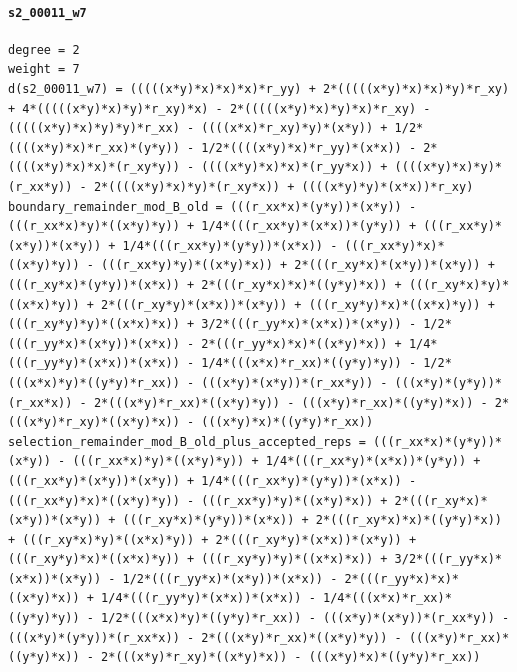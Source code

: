 \documentclass[11pt]{article}
\begin{document}
\paragraph{\texttt{s2\_00011\_w7}}
\begin{verbatim}
degree = 2
weight = 7
d(s2_00011_w7) = (((((x*y)*x)*x)*x)*r_yy) + 2*(((((x*y)*x)*x)*y)*r_xy) + 4*(((((x*y)*x)*y)*r_xy)*x) - 2*(((((x*y)*x)*y)*x)*r_xy) - (((((x*y)*x)*y)*y)*r_xx) - ((((x*x)*r_xy)*y)*(x*y)) + 1/2*((((x*y)*x)*r_xx)*(y*y)) - 1/2*((((x*y)*x)*r_yy)*(x*x)) - 2*((((x*y)*x)*x)*(r_xy*y)) - ((((x*y)*x)*x)*(r_yy*x)) + ((((x*y)*x)*y)*(r_xx*y)) - 2*((((x*y)*x)*y)*(r_xy*x)) + ((((x*y)*y)*(x*x))*r_xy)
boundary_remainder_mod_B_old = (((r_xx*x)*(y*y))*(x*y)) - (((r_xx*x)*y)*((x*y)*y)) + 1/4*(((r_xx*y)*(x*x))*(y*y)) + (((r_xx*y)*(x*y))*(x*y)) + 1/4*(((r_xx*y)*(y*y))*(x*x)) - (((r_xx*y)*x)*((x*y)*y)) - (((r_xx*y)*y)*((x*y)*x)) + 2*(((r_xy*x)*(x*y))*(x*y)) + (((r_xy*x)*(y*y))*(x*x)) + 2*(((r_xy*x)*x)*((y*y)*x)) + (((r_xy*x)*y)*((x*x)*y)) + 2*(((r_xy*y)*(x*x))*(x*y)) + (((r_xy*y)*x)*((x*x)*y)) + (((r_xy*y)*y)*((x*x)*x)) + 3/2*(((r_yy*x)*(x*x))*(x*y)) - 1/2*(((r_yy*x)*(x*y))*(x*x)) - 2*(((r_yy*x)*x)*((x*y)*x)) + 1/4*(((r_yy*y)*(x*x))*(x*x)) - 1/4*(((x*x)*r_xx)*((y*y)*y)) - 1/2*(((x*x)*y)*((y*y)*r_xx)) - (((x*y)*(x*y))*(r_xx*y)) - (((x*y)*(y*y))*(r_xx*x)) - 2*(((x*y)*r_xx)*((x*y)*y)) - (((x*y)*r_xx)*((y*y)*x)) - 2*(((x*y)*r_xy)*((x*y)*x)) - (((x*y)*x)*((y*y)*r_xx))
selection_remainder_mod_B_old_plus_accepted_reps = (((r_xx*x)*(y*y))*(x*y)) - (((r_xx*x)*y)*((x*y)*y)) + 1/4*(((r_xx*y)*(x*x))*(y*y)) + (((r_xx*y)*(x*y))*(x*y)) + 1/4*(((r_xx*y)*(y*y))*(x*x)) - (((r_xx*y)*x)*((x*y)*y)) - (((r_xx*y)*y)*((x*y)*x)) + 2*(((r_xy*x)*(x*y))*(x*y)) + (((r_xy*x)*(y*y))*(x*x)) + 2*(((r_xy*x)*x)*((y*y)*x)) + (((r_xy*x)*y)*((x*x)*y)) + 2*(((r_xy*y)*(x*x))*(x*y)) + (((r_xy*y)*x)*((x*x)*y)) + (((r_xy*y)*y)*((x*x)*x)) + 3/2*(((r_yy*x)*(x*x))*(x*y)) - 1/2*(((r_yy*x)*(x*y))*(x*x)) - 2*(((r_yy*x)*x)*((x*y)*x)) + 1/4*(((r_yy*y)*(x*x))*(x*x)) - 1/4*(((x*x)*r_xx)*((y*y)*y)) - 1/2*(((x*x)*y)*((y*y)*r_xx)) - (((x*y)*(x*y))*(r_xx*y)) - (((x*y)*(y*y))*(r_xx*x)) - 2*(((x*y)*r_xx)*((x*y)*y)) - (((x*y)*r_xx)*((y*y)*x)) - 2*(((x*y)*r_xy)*((x*y)*x)) - (((x*y)*x)*((y*y)*r_xx))
\end{verbatim}
\end{document}
